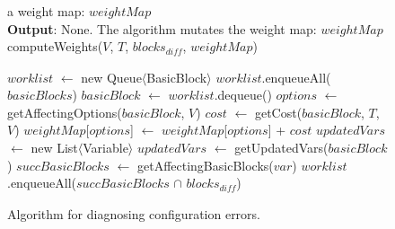 \begin{figure}[t]
\quad a weight map: $\mathit{weightMap}$\\
\textbf{Output}: None. The algorithm mutates the weight map: $\mathit{weightMap}$\\
\vspace{-4mm}%
computeWeights($\mathit{V}$, $\mathit{T}$, $\mathit{blocks_{diff}}$, $\mathit{weightMap}$)\\
\begin{algorithmic}[1]
\STATE $\mathit{worklist}$ $\leftarrow$ new Queue$\langle$BasicBlock$\rangle$
\STATE $\mathit{worklist}$.enqueueAll($\mathit{basicBlocks}$)
\STATE $\mathit{basicBlock}$ $\leftarrow$ $\mathit{worklist}$.dequeue()
\STATE $\mathit{options}$ $\leftarrow$ getAffectingOptions($\mathit{basicBlock}$, $\mathit{V}$)
\STATE $\mathit{cost}$ $\leftarrow$ getCost($\mathit{basicBlock}$, $\mathit{T}$, $\mathit{V}$)
\STATE $\mathit{weightMap}$[$\mathit{options}$] $\leftarrow$ $\mathit{weightMap}$[$\mathit{options}$] + $\mathit{cost}$
\ENDFOR
\STATE $\mathit{updatedVars}$ $\leftarrow$ new List$\langle$Variable$\rangle$
\STATE $\mathit{updatedVars}$ $\leftarrow$ getUpdatedVars($\mathit{basicBlock}$)
\ENDIF
{}
\STATE $\mathit{succBasicBlocks}$ $\leftarrow$ getAffectingBasicBlocks($\mathit{var}$)
\STATE $\mathit{worklist}$.enqueueAll($\mathit{succBasicBlocks}$ $\cap$ $\mathit{blocks_{diff}}$)
\ENDIF
\ENDFOR
\ENDWHILE
\vspace{-2mm}
\end{algorithmic}
\caption{Algorithm for diagnosing configuration errors.
}
\end{figure}
